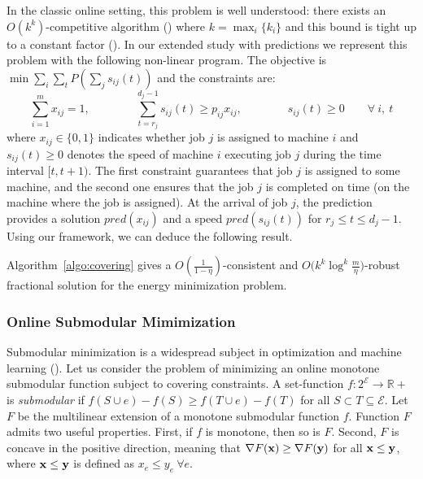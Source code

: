 In the classic online setting, this problem is well understood: there exists an $O(k^{k})$-competitive algorithm (\cite{Thang20:Online-Primal-Dual}) where $k = \max_{i} \{k_{i}\}$
and this bound is tight up to a constant factor (\cite{Caragiannis08:Better-bounds}). In our extended study with predictions we represent this problem with the following non-linear program. The objective is $\min \sum_{i} \sum_{t} P(\sum_{j} s_{ij}(t))$ and the constraints are:
$$
\sum_{i=1}^{m} x_{ij} = 1,  \qquad \qquad \sum_{t = r_{j}}^{d_{j}-1} s_{ij}(t) \geq p_{ij} x_{ij}, \qquad  \qquad s_{ij}(t) \geq 0  \qquad \forall\ i,\ t
$$
where $x_{ij} \in \{0,1\}$ indicates whether job $j$ is assigned to machine $i$
and $s_{ij}(t) \geq 0$ denotes the speed of machine $i$ executing job $j$ during the time interval $[t, t+1)$.
The first constraint guarantees that job $j$ is assigned to some machine, and the second one ensures
that the job $j$ is completed on time (on the machine where the job is assigned). At the arrival of
job $j$, the prediction provides a solution $pred(x_{ij})$ and a speed $pred(s_{ij}(t))$ for $r_{j} \leq t \leq d_{j} - 1$.
Using our framework, we can deduce the following result.

\begin{proposition}
Algorithm~\ref{algo:covering} gives a
$O(\frac{1}{1 - \eta})$-consistent and $O\bigl(k^{k} \log^{k} \frac{m}{\eta}\bigr)$-robust fractional solution
for the energy minimization problem.
\end{proposition}


\subsubsection{Online Submodular Mimimization}	\label{sec:sub-min}

Submodular minimization is a widespread subject in optimization and machine learning (\cite{IwataFleischer01:A-combinatorial-strongly,Bachothers13:Learning-with,Bach16:Submodular-functions:,BalkanskiSinger:2020}). Let us consider the problem of minimizing an online monotone submodular function subject to covering constraints.
A set-function $f: 2^{\mathcal{E}} \rightarrow \mathbb{R}+$ is \emph{submodular} if
$f(S \cup e) - f(S) \geq f(T \cup e) - f(T)$ for all $S \subset T \subseteq \mathcal{E}$.
Let $F$ be the multilinear extension of a monotone submodular function $f$. Function $F$
admits two useful properties. First, if $f$ is monotone, then so is $F$. Second, $F$ is concave in
the positive direction, meaning that $\nabla F(\mathbf{x}) \geq \nabla F(\mathbf{y})$ for all $\mathbf{x} \leq \mathbf{y}$, where $\mathbf{x} \leq \mathbf{y}$ is defined as $x_{e} \leq y_{e} ~\forall e$.

